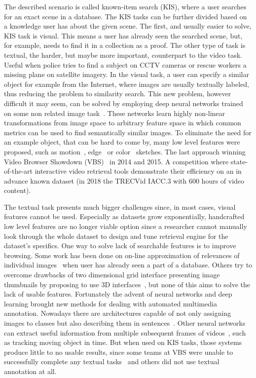 The described scenario is called known-item search (KIS), where a user searches for an exact scene in a database. The KIS tasks can be further divided based on a knowledge user has about the given scene. The first, and usually easier to solve, KIS task is visual. This means a user has already seen the searched scene, but, for example, needs to find it in a collection as a proof. The other type of task is textual, the harder, but maybe more important, counterpart to the video task. Useful when police tries to find a subject on CCTV cameras or rescue workers a missing plane on satellite imagery. In the visual task, a user can specify a similar object for example from the Internet, where images are usually textually labeled, thus reducing the problem to similarity search. This new problem, however difficult it may seem, can be solved by employing deep neural networks trained on some non related image task~\cite{deepFeatures}. These networks learn highly non-linear transformations from image space to arbitrary feature space in which common metrics can be used to find semantically similar images.
To eliminate the need for an example object, that can be hard to come by, many low level features were proposed, such as motion~\cite{motionSketch}, edge~\cite{eitz2009descriptor} or color~\cite{sigBrowser} sketches. The last approach winning Video Browser Showdown (VBS)~\cite{cobarzan2017interactive} in 2014 and 2015. A competition where state-of-the-art interactive video retrieval tools demonstrate their efficiency on an in advance known dataset (in 2018 the TRECVid IACC.3 with 600 hours of video content).

The textual task presents much bigger challenges since, in most cases, visual features cannot be used. Especially as datasets grow exponentially, handcrafted low level features are no longer viable option since a researcher cannot manually look through the whole dataset to design and tune retrieval engine for the dataset's specifics. One way to solve lack of searchable features is to improve browsing. Some work has been done on on-line approximation of relevances of individual images~\cite{suditu2011heat} when user has already seen a part of a database. Others try to overcome drawbacks of two dimensional grid interface presenting image thumbnails by proposing to use 3D interfaces~\cite{schoeffmann20143}, but none of this aims to solve the lack of usable features. Fortunately the advent of neural networks and deep learning brought new methods for dealing with automated multimedia annotation. Nowadays there are architectures capable of not only assigning images to classes but also describing them in sentences~\cite{vinyals2017show}. Other neural networks can extract useful information from multiple subsequent frames of videos~\cite{bertinetto2016fully}, such as tracking moving object in time. But when used on KIS tasks, those systems produce little to no usable results, since some teams at VBS were unable to successfully complete any textual tasks~\cite{Lokoc-influential-trends} and others did not use textual annotation at all.

